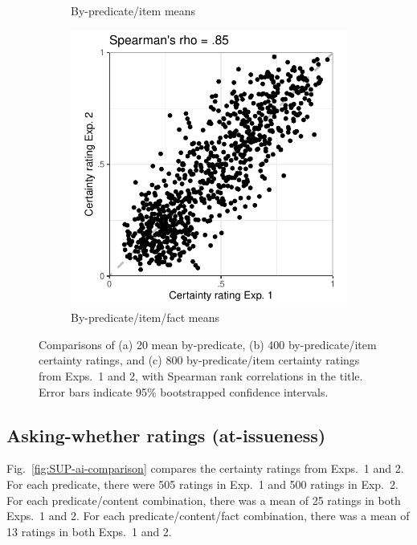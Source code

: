 \documentclass[11pt,fleqn]{article}
\newcommand{\6}{\mbox{$[\hspace*{-.6mm}[$}}
\newcommand{\9}{\mbox{$]\hspace*{-.6mm}]$}}
\begin{document}
\begin{figure}[h!]
\begin{subfigure}[t]{.3\textwidth}
\caption{By-predicate/item means}
\end{subfigure}\hfill
\begin{subfigure}[t]{.3\textwidth}
\centering
\includegraphics[width=\textwidth]{../../results/exp1/graphs/SUP-certainty-PredItemFact-Exp1-by-Exp2}
\caption{By-predicate/item/fact means}
\end{subfigure}  
\caption{Comparisons of (a) 20 mean by-predicate, (b) 400 by-predicate/item certainty ratings, and (c) 800 by-predicate/item certainty ratings from Exps.~1 and 2,  with Spearman rank correlations in the title. Error bars indicate 95\% bootstrapped confidence intervals.}\label{fig:SUP-certainty-comparison}
\end{figure}

\newpage

\subsection{Asking-whether ratings (at-issueness)}

Fig.~\ref{fig:SUP-ai-comparison} compares the certainty ratings from Exps.~1 and 2. For each predicate, there were 505 ratings in Exp.~1 and 500 ratings in Exp.~2. For each predicate/content combination, there was a mean of 25 ratings in both Exps.~1 and 2. For each predicate/content/fact combination, there was a mean of 13 ratings in both Exps.~1 and 2.
\end{document}
